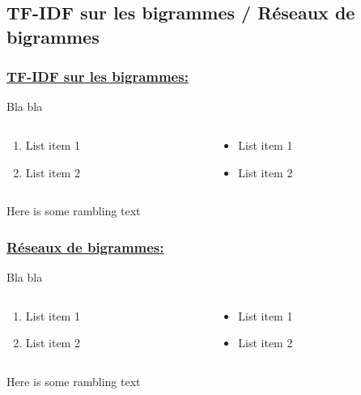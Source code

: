 \documentclass[xcolor=dvipsnames]{beamer}
\begin{document}
	\subsection*{TF-IDF sur les bigrammes / Réseaux de bigrammes}

	\begin{frame}
		\frametitle{\underline{TF-IDF sur les bigrammes:}}
		Bla bla 
		\begin{columns}
			\begin{column}{0.5\textwidth} %
				\begin{enumerate}
					\item List item 1
					\item List item 2
				\end{enumerate}
			\end{column}
			\begin{column}{0.5\textwidth}
				\begin{itemize}
					\item List item 1
					\item List item 2
				\end{itemize}
			\end{column}
		\end{columns}
		\vspace{\baselineskip}
		Here is some rambling text
	\end{frame}

	\begin{frame}
		\frametitle{\underline{Réseaux de bigrammes:}}
		Bla bla 
		\begin{columns}
			\begin{column}{0.5\textwidth} %
				\begin{enumerate}
					\item List item 1
					\item List item 2
				\end{enumerate}
			\end{column}
			\begin{column}{0.5\textwidth}
				\begin{itemize}
					\item List item 1
					\item List item 2
				\end{itemize}
			\end{column}
		\end{columns}
		\vspace{\baselineskip}
		Here is some rambling text
	\end{frame}
\end{document}
